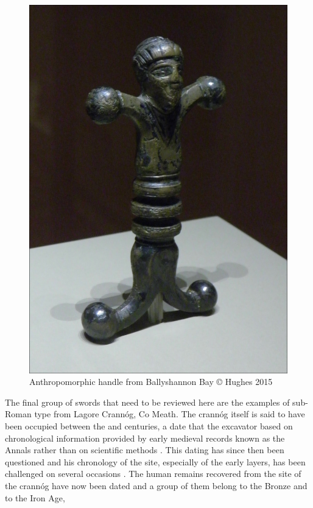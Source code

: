\begin{figure}
\includegraphics[width=\linewidth]{figures/Hughes_Sword_fig05.jpg} 
\caption{Anthropomorphic handle from Ballyshannon Bay © Hughes 2015}
\label{hughes_fig5}
\end{figure}
The final group of swords that need to be reviewed here are the examples of sub-Roman type from Lagore Crannóg, Co Meath. 
The crannóg itself is said to have been occupied between the  and  centuries, 
a date that the excavator based on chronological information provided by
 early medieval records known as the Annals rather than on scientific methods \parencite[6]{Hencken1950}. 
 This dating has since then been questioned and his chronology of the site, especially of the early layers, 
 has been challenged on several occasions \parencites(e.g.)(){Lynn1985-6}[77\psqq]{CahillWilson2010}.  
 The human remains recovered from the site of the crannóg have now been dated and a group of them belong to the Bronze and to the Iron Age, 

